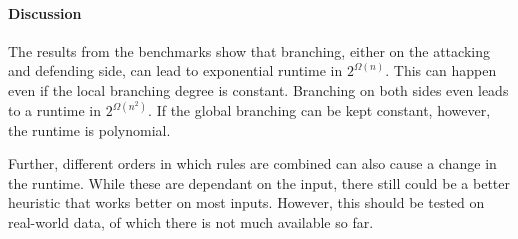 \paragraph{Discussion}

The results from the benchmarks show that branching, either on the attacking
and defending side, can lead to exponential runtime in $2^{\mathcal Ω(n)}$.
This can happen even if the local branching degree is constant.
Branching on both sides even leads to a runtime in $2^{\mathcal Ω(n^2)}$.
If the global branching can be kept constant, however, the runtime is
polynomial.

Further, different orders in which rules are combined can also cause
a change in the runtime. While these are dependant on the input,
there still could be a better heuristic that works better on most inputs.
However, this should be tested on real-world data, of which there is not
much available so far.

